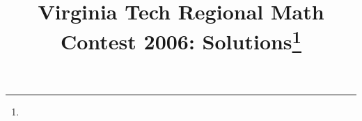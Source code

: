 \documentclass[10pt]{article}
\begin{document}
\title{Virginia Tech Regional Math Contest 2006: Solutions\footnote{\disclaimer}}
\author{\vspace{-2ex}}
\date{\vspace{-5ex}} %
\maketitle

%

%

%

%

%

%

%
\end{document}
